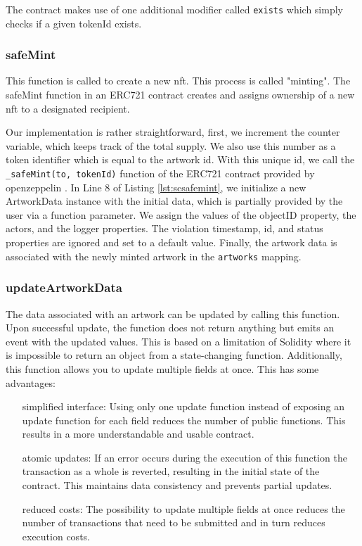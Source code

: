 The contract makes use of one additional modifier called \texttt{exists} which simply checks if a given tokenId exists.

\subsubsection{safeMint}
This function is called to create a new \gls{nft}. This process is called "minting". The safeMint function in an ERC721 contract creates and assigns ownership of a new \gls{nft} to a designated recipient. 



Our implementation is rather straightforward, first, we increment the counter variable, which keeps track of the total supply. We also use this number as a token identifier which is equal to the artwork \gls{id}. With this unique \gls{id}, we call the \texttt{\_safeMint(to, tokenId)} function of the ERC721 contract provided by openzeppelin \cite{openzeppelin}. In Line 8 of Listing \ref{lst:scsafemint}, we initialize a new ArtworkData instance with the initial data, which is partially provided by the user via a function parameter. We assign the values of the objectID property, the actors, and the logger properties. The violation timestamp, \gls{id}, and status properties are ignored and set to a default value. Finally, the artwork data is associated with the newly minted artwork in the \texttt{artworks} mapping.

\subsubsection{updateArtworkData}
The data associated with an artwork can be updated by calling this function. Upon successful update, the function does not return anything but emits an event with the updated values. This is based on a limitation of Solidity where it is impossible to return an object from a state-changing function. Additionally, this function allows you to update multiple fields at once. This has some advantages:

\begin{itemize}[align=left, font=\itshape]
    \item[simplified interface:] Using only one update function instead of exposing an update function for each field reduces the number of public functions. This results in a more understandable and usable contract.
    \item[atomic updates:] If an error occurs during the execution of this function the transaction as a whole is reverted, resulting in the initial state of the contract. This maintains data consistency and prevents partial updates.
    \item[reduced costs:] The possibility to update multiple fields at once reduces the number of transactions that need to be submitted and in turn reduces execution costs.
\end{itemize}


